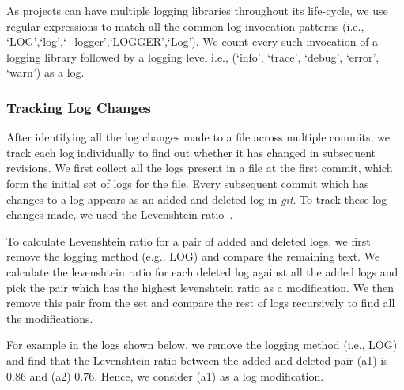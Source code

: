 
As projects can have multiple logging libraries throughout its life-cycle, we use regular expressions to match all the common log invocation patterns (i.e., `LOG',`log',`\_logger',`LOGGER',`Log'). We count every such invocation of a logging library followed by a logging level i.e., (`info', `trace', `debug', `error', `warn') as a log.



\subsubsection{Tracking Log Changes}
After identifying all the log changes made to a file across multiple commits, we track each log individually to find out whether it has changed in subsequent revisions. We first collect all the logs present in a file at the first commit, which form the initial set of logs for the file. Every subsequent commit which has changes to a log appears as an added and deleted log in \textsl{git}. To track these log changes made, we used the Levenshtein ratio~\cite{levenshteinratio}.

To calculate Levenshtein ratio for a pair of added and deleted logs, we first remove the logging method (e.g., LOG) and compare the remaining text. We calculate the levenshtein ratio for each deleted log against all the added logs and pick the pair which has the highest levenshtein ratio  as a modification. We then remove this pair from the set and compare the rest of logs recursively to find all the modifications. 


 For example in the logs shown below, we remove the logging method (i.e., LOG) and find that the Levenshtein ratio between the added and deleted pair (a1) is 0.86 and (a2) 0.76. Hence, we consider (a1) as a log modification.  


